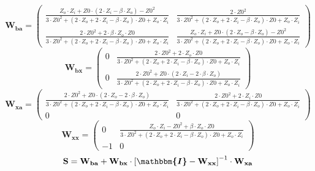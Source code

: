 \[ \mathbf{W_{ba}} = \left(\begin{smallmatrix} \frac{Z_o\cdot
Z_i+Z0\cdot  (2\cdot Z_i-\beta\cdot Z_o )-Z0^2}{3\cdot Z0^2+ (2\cdot
Z_o+2\cdot Z_i-\beta\cdot Z_o )\cdot Z0+Z_o\cdot Z_i} & \frac{2\cdot
Z0^2}{3\cdot Z0^2+ (2\cdot Z_o+2\cdot Z_i-\beta\cdot Z_o )\cdot
Z0+Z_o\cdot Z_i} \\ \frac{2\cdot Z0^2+2\cdot \beta\cdot Z_o\cdot
Z0}{3\cdot Z0^2+ (2\cdot Z_o+2\cdot Z_i-\beta\cdot Z_o )\cdot
Z0+Z_o\cdot Z_i} & \frac{Z_o\cdot Z_i+Z0\cdot  (2\cdot Z_o-\beta\cdot
Z_o )-Z0^2}{3\cdot Z0^2+ (2\cdot Z_o+2\cdot Z_i-\beta\cdot Z_o )\cdot
Z0+Z_o\cdot Z_i} \end{smallmatrix}\right) \]
\[ \mathbf{W_{bx}} = \left(\begin{smallmatrix} 0 & \frac{2\cdot
Z0^2+2\cdot Z_o\cdot Z0}{3\cdot Z0^2+ (2\cdot Z_o+2\cdot
Z_i-\beta\cdot Z_o )\cdot Z0+Z_o\cdot Z_i} \\ 0 & \frac{2\cdot
Z0^2+Z0\cdot  (2\cdot Z_i-2\cdot \beta\cdot Z_o )}{3\cdot Z0^2+
(2\cdot Z_o+2\cdot Z_i-\beta\cdot Z_o )\cdot Z0+Z_o\cdot Z_i}
\end{smallmatrix}\right) \]
\[ \mathbf{W_{xa}} = \left(\begin{smallmatrix} \frac{2\cdot
Z0^2+Z0\cdot  (2\cdot Z_o-2\cdot \beta\cdot Z_o )}{3\cdot Z0^2+
(2\cdot Z_o+2\cdot Z_i-\beta\cdot Z_o )\cdot Z0+Z_o\cdot Z_i} &
\frac{2\cdot Z0^2+2\cdot Z_i\cdot Z0}{3\cdot Z0^2+ (2\cdot Z_o+2\cdot
Z_i-\beta\cdot Z_o )\cdot Z0+Z_o\cdot Z_i} \\ 0 & 0
\end{smallmatrix}\right) \]
\[ \mathbf{W_{xx}} = \left(\begin{smallmatrix} 0 & \frac{Z_o\cdot
Z_i-Z0^2+\beta\cdot Z_o\cdot Z0}{3\cdot Z0^2+ (2\cdot Z_o+2\cdot
Z_i-\beta\cdot Z_o )\cdot Z0+Z_o\cdot Z_i} \\ -1 & 0
\end{smallmatrix}\right) \]
\[ \mathbf{S}=\mathbf{W_{ba}}+\mathbf{W_{bx}}\cdot\left[
\boldsymbol{\mathbbm{I}}
-\mathbf{W_{xx}}\right]^{-1}\cdot\mathbf{W_{xa}} \]
